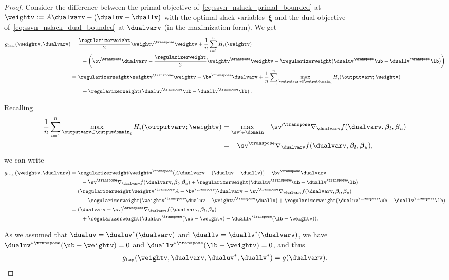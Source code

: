 \documentclass{article}
\begin{document}
\begin{proof}
Consider the difference between the primal objective of~\eqref{eq:ssvn_nslack_primal_bounded} at $\weightv := A\dualvarv-(\dualuv-\duallv)$  with the optimal slack variables~$\bm{\xi}$ and the dual objective of~\eqref{eq:ssvn_nslack_dual_bounded} at $\dualvarv$ (in the maximization form).
We get
\begin{align*}
g_{\text{\tiny Lag.}}(\weightv,\dualvarv)&=\frac\regularizerweight2 \weightv^\transpose \weightv + \frac1n \sum_{i=1}^n \tilde{H}_i(\weightv) \\
& \qquad - \left(\bv^\transpose \dualvarv - \frac\regularizerweight2 \weightv^\transpose \weightv - \regularizerweight ( \dualuv^{\transpose} \ub - \duallv^{\transpose} \lb ) \right) \\
&= \regularizerweight \weightv^\transpose \weightv - \bv^\transpose \dualvarv + \frac1n \sum_{i=1}^n \max_{\outputvarv\in\outputdomain_i} H_i(\outputvarv;\weightv) \\
&\qquad + \regularizerweight ( \dualuv^{\transpose} \ub - \duallv^{\transpose} \lb ) \ .
\end{align*}

Recalling
\begin{align*}
\frac1n \sum_{i=1}^n \max_{\outputvarv\in\outputdomain_i} H_i(\outputvarv;\weightv) &=  \max_{\sv'\in \domain} -\sv'^\transpose \nabla_{\dualvarv} f(\dualvarv, \bm{\beta}_l, \bm{\beta}_u) \\ &= -\sv^\transpose \nabla_{\dualvarv} f(\dualvarv, \bm{\beta}_l, \bm{\beta}_u),
\end{align*}
we can write
\begin{align*}
g_{\text{\tiny Lag.}}(\weightv,\dualvarv)  &=  \regularizerweight \weightv^\transpose (A\dualvarv-(\dualuv-\duallv)) - \bv^\transpose \dualvarv  \\
&\qquad - \sv^{\transpose}\nabla_{\dualvarv} f(\dualvarv, \bm{\beta}_l, \bm{\beta}_u) + \regularizerweight ( \dualuv^{\transpose} \ub - \duallv^{\transpose} \lb ) \\
&= (\regularizerweight \weightv^\transpose  A - \bv^\transpose ) \dualvarv - \sv^\transpose\nabla_{\dualvarv} f(\dualvarv, \bm{\beta}_l, \bm{\beta}_u)  \\
&\qquad -\regularizerweight ( \weightv^\transpose  \dualuv - \weightv^\transpose \duallv)
+ \regularizerweight ( \dualuv^{\transpose} \ub - \duallv^{\transpose} \lb )  \\
	&= (\dualvarv - \sv)^\transpose \nabla_{\dualvarv} f(\dualvarv, \bm{\beta}_l, \bm{\beta}_u)
	\\&\qquad +  \regularizerweight(\dualuv^{\transpose}(\ub-\weightv)
	-\duallv^\transpose (\lb-\weightv)).
\end{align*}

As we assumed that $\dualuv = \dualuv^{*}(\dualvarv)$ and $\duallv = \duallv^{*}(\dualvarv)$, we have $\dualuv^{*\transpose}(\ub-\weightv)=0$ and $\duallv^{*\transpose}(\lb-\weightv)=0$, and thus
\begin{align*}
g_{\text{\tiny Lag}}(\weightv,\dualvarv,\dualuv^*,\duallv^*) = g(\dualvarv).
\end{align*}
\end{proof}
%
\end{document}
